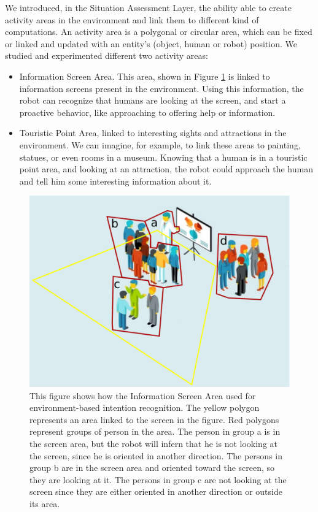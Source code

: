 We introduced, in the Situation Assessment Layer, the ability able to create activity areas in the environment and link them to different kind of computations. An activity area is a polygonal or circular area, which can be fixed or linked and updated with an entity's (object, human or robot) position. We studied and experimented different two activity areas:

\begin{itemize}
\item Information Screen Area. This area, shown in Figure \ref{fig:case_study-spencer-screen_area} is linked to information screens present in the environment. Using this information, the robot can recognize that humans are looking at the screen, and  start a proactive behavior, like approaching to offering help or information.
\item Touristic Point Area, linked to interesting sights and attractions in the environment. We can imagine, for example, to link these areas to painting, statues, or even rooms in a museum. Knowing that a human is in a touristic point area, and looking at an attraction, the robot could approach the human and tell him some interesting information about it.
\end{itemize}

\begin{figure}[ht!]
	\centering
	\includegraphics[scale=0.45]{img/case_study/spencer/environment_intention.pdf}
	\caption{This figure shows how the Information Screen Area used for environment-based intention recognition. The yellow polygon represents an area linked to the screen in the figure. Red polygons represent groups of person in the area. The person in group a is in the screen area, but the robot will infern that he is not looking at the screen, since he is oriented in another direction. The persons in group b are in the screen area and oriented toward the screen, so they are looking at it. The persons in group c are not looking at the screen since they are either oriented in another direction or outside its area.}
	\label{fig:case_study-spencer-screen_area}
\end{figure}


